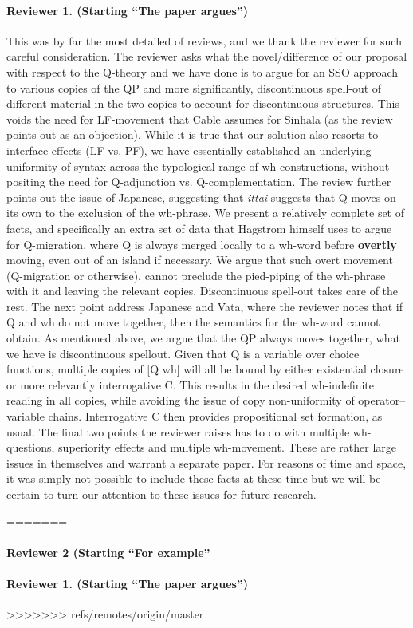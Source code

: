 \documentclass[11pt]{article}
\begin{document}
\paragraph{Reviewer 1.  (Starting ``The paper argues'')} This was by far the most detailed of reviews, and we thank the reviewer for such careful consideration. The reviewer asks what the novel/difference of our proposal with respect to the Q-theory and we have done is to argue for an SSO approach to various copies of the QP and more significantly, discontinuous spell-out of different material in the two copies to account for discontinuous structures. This voids the need for LF-movement that Cable assumes for Sinhala (as the review points out as an objection). While it is true that our solution also resorts to interface effects (LF vs. PF), we have essentially established an underlying uniformity of syntax across the typological range of wh-constructions, without positing the need for Q-adjunction vs. Q-complementation. The review further points out the issue of Japanese, suggesting that \textit{ittai} suggests that Q moves on its own to the exclusion of the wh-phrase. We present a relatively complete set of facts, and specifically an extra set of data that Hagstrom himself uses to argue for Q-migration, where Q is always merged locally to a wh-word before \textbf{overtly} moving, even out of an island if necessary. We argue that such overt movement (Q-migration or otherwise), cannot preclude the pied-piping of the wh-phrase with it and leaving the relevant copies. Discontinuous spell-out takes care of the rest. The next point address Japanese and Vata, where the reviewer notes that if Q and wh do not move together, then the semantics for the wh-word cannot obtain. As mentioned above, we argue that the QP always moves together, what we have is discontinuous spellout. Given that Q is a variable over choice functions, multiple copies of [Q wh] will all be bound by either existential closure or more relevantly interrogative C. This results in the desired wh-indefinite reading in all copies, while avoiding the issue of copy non-uniformity of operator--variable chains. Interrogative C then provides propositional set formation, as usual. The final two points the reviewer raises has to do with multiple wh-questions, superiority effects and multiple wh-movement. These are rather large issues in themselves and warrant a separate paper. For reasons of time and space, it was simply not possible to include these facts at these time but we will be certain to turn our attention to these issues for future research.


=======
\paragraph{Reviewer 2 (Starting ``For example''} 
\paragraph{Reviewer 1.  (Starting ``The paper argues'')}
>>>>>>> refs/remotes/origin/master
\end{document}
